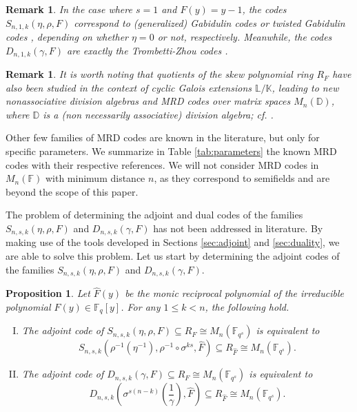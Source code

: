 \documentclass[a4paper, 11pt]{article}
\newtheorem{proposition}[theorem]{Proposition}
\newtheorem{remark}[theorem]{Remark}
\newcommand{\F}{{\mathbb F}}
\begin{document}
\begin{remark} \label{rK:MRDs1}
In the case where $s=1$ and $F(y) = y - 1$, the codes $S_{n,1,k}(\eta, \rho, F)$ correspond to (generalized) Gabidulin codes \cite{delsarte1978bilinear,gabidulin1985theory,Gabidulins} or twisted Gabidulin codes \cite{sheekey2016new,otal2016additive,lunardon2018generalized}, depending on whether $\eta = 0$ or not, respectively. Meanwhile, the codes $D_{n,1,k}(\gamma, F)$ are exactly the Trombetti-Zhou codes \cite{trombetti2018new}.
\end{remark}

\begin{remark}
It is worth noting that quotients of the skew polynomial ring \( R_F \) have also been studied in the context of cyclic Galois extensions \( \mathbb{L}/\mathbb{K} \), leading to new nonassociative division algebras and MRD codes over matrix spaces \( M_n(\mathbb{D}) \), where \( \mathbb{D} \) is a (non necessarily associative) division algebra; cf. \cite{sheekey2020new,thompson2023division,lobillo2025quotients}.   
\end{remark}

Other few families of MRD codes are known in the literature, but only for specific parameters. We summarize in Table \ref{tab:parameters} the known MRD codes with their respective references. We will not consider MRD codes in $M_n(\F)$ with minimum distance $n$, as they correspond to semifields and are beyond the scope of this paper.


The problem of determining the adjoint and dual codes of the families $S_{n,s,k}(\eta,\rho,F)$ and $D_{n,s,k}(\gamma,F)$ has not been addressed in literature. By making use of the tools developed in Sections \ref{sec:adjoint} and \ref{sec:duality}, we are able to solve this problem. Let us start by determining the adjoint codes of the families $S_{n,s,k}(\eta,\rho,F)$ and $D_{n,s,k}(\gamma,F)$.

\begin{proposition} \label{prop:determinantionadjoint}
Let $\hat{F}(y)$ be the monic reciprocal polynomial of the irreducible polynomial $F(y) \in \F_q[y]$. For any $1 \leq k<n$, the following hold. 

\begin{enumerate}[I)]
\item\label{adjointS} The adjoint code of $S_{n,s,k}(\eta,\rho,F) \subseteq R_F \cong M_n(\F_{q^s})$ is equivalent to
\[
S_{n,s,k}(\rho^{-1}(\eta^{-1}),\rho^{-1}\circ \sigma^{ks},\hat{F}) \subseteq R_{\hat{F}} \cong M_n(\F_{q^s}).
\]
\item\label{adjointD} The adjoint code of  $D_{n,s,k}(\gamma,F) \subseteq R_F \cong M_n(\F_{q^s})$ is equivalent to
 \[D_{n,s,k}\left(\sigma^{s(n-k)}\left(\frac{1}{\gamma}\right),\hat{F}\right)\subseteq R_{\hat{F}} \cong M_n(\F_{q^s}).
 \]
\end{enumerate}
\end{proposition}
\end{document}
